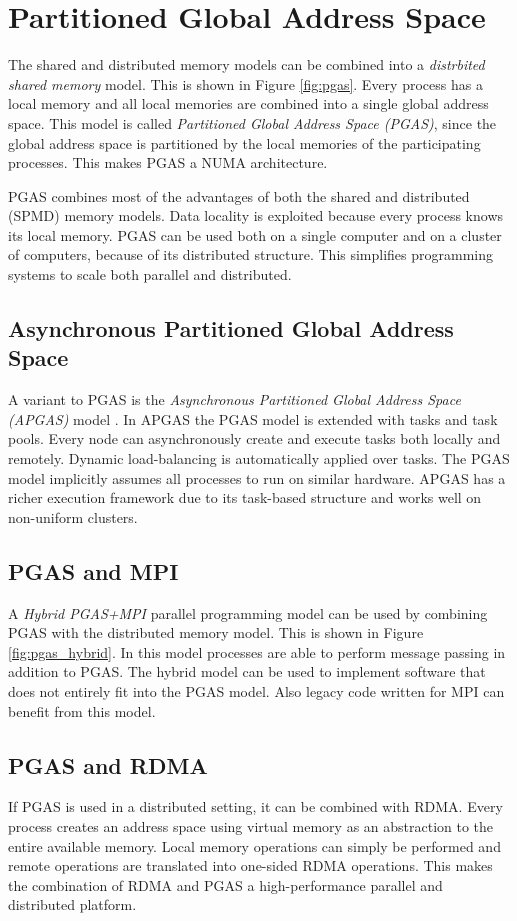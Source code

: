 \section{Partitioned Global Address Space}
The shared and distributed memory models can be combined into a \emph{distrbited shared memory} model. This is shown in Figure \ref{fig:pgas}. Every process has a local memory and all local memories are combined into a single global address space. This model is called \emph{Partitioned Global Address Space (PGAS)}, since the global address space is partitioned by the local memories of the participating processes. This makes PGAS a NUMA architecture.

PGAS combines most of the advantages of both the shared and distributed (SPMD) memory models. Data locality is exploited because every process knows its local memory. PGAS can be used both on a single computer and on a cluster of computers, because of its distributed structure. This simplifies programming systems to scale both parallel and distributed. 

\subsection{Asynchronous Partitioned Global Address Space}
A variant to PGAS is the \emph{Asynchronous Partitioned Global Address Space (APGAS)} model \cite{APGAS}. In APGAS the PGAS model is extended with tasks and task pools. Every node can asynchronously create and execute tasks both locally and remotely. Dynamic load-balancing is automatically applied over tasks. The PGAS model implicitly assumes all processes to run on similar hardware. APGAS has a richer execution framework due to its task-based structure and works well on non-uniform clusters.

\subsection{PGAS and MPI}
A \emph{Hybrid PGAS+MPI} parallel programming model can be used by combining PGAS with the distributed memory model. This is shown in Figure \ref{fig:pgas_hybrid}. In this model processes are able to perform message passing in addition to PGAS. The hybrid model can be used to implement software that does not entirely fit into the PGAS model. Also legacy code written for MPI can benefit from this model.

\subsection{PGAS and RDMA}
If PGAS is used in a distributed setting, it can be combined with RDMA. Every process creates an address space using virtual memory as an abstraction to the entire available memory. Local memory operations can simply be performed and remote operations are translated into one-sided RDMA operations. This makes the combination of RDMA and PGAS a high-performance parallel and distributed platform. 


